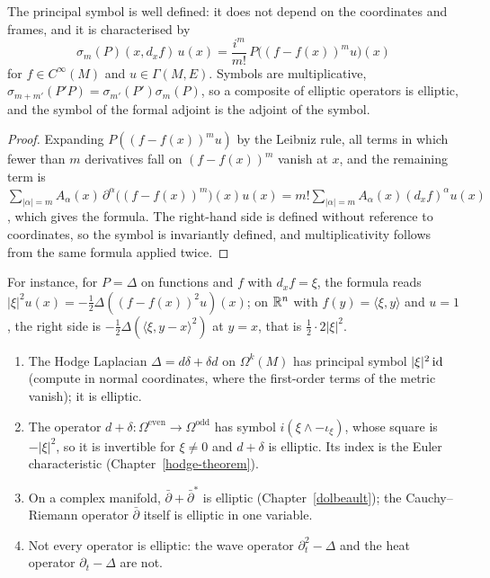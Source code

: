 \begin{proposition}\label{elliptic-operators:proposition-symbol}
The principal symbol is well defined: it does not depend on the coordinates and frames, and it is characterised by
\[
\sigma_m(P)(x, d_xf)\,u(x) = \frac{i^m}{m!}\,P\big((f - f(x))^mu\big)(x)
\]
for $f \in C^\infty(M)$ and $u \in \Gamma(M, E)$. Symbols are multiplicative, $\sigma_{m+m'}(P'P) = \sigma_{m'}(P')\sigma_m(P)$, so a composite of elliptic operators is elliptic, and the symbol of the formal
adjoint is the adjoint of the symbol.
\end{proposition}

\begin{proof}
Expanding $P((f - f(x))^mu)$ by the Leibniz rule, all terms in which fewer than $m$ derivatives fall on $(f - f(x))^m$ vanish at $x$, and the remaining term is
$\sum_{|\alpha| = m}A_\alpha(x)\,\partial^\alpha\big((f - f(x))^m\big)(x)u(x) = m!\sum_{|\alpha| = m}A_\alpha(x)(d_xf)^\alpha u(x)$, which gives the formula. The right-hand side is defined without reference to
coordinates, so the symbol is invariantly defined, and multiplicativity follows from the same formula applied twice.
\end{proof}

For instance, for $P = \Delta$ on functions and $f$ with $d_xf = \xi$, the formula reads $|\xi|^2u(x) = -\frac12\Delta((f - f(x))^2u)(x)$; on $\mathbb{R}^n$ with $f(y) = \langle\xi, y\rangle$ and $u = 1$, the right
side is $-\frac12\Delta(\langle\xi, y - x\rangle^2)$ at $y = x$, that is $\frac12 \cdot 2|\xi|^2$.

\begin{example}\label{elliptic-operators:example-elliptic}
\begin{enumerate}
\item The Hodge Laplacian $\Delta = d\delta + \delta d$ on $\Omega^k(M)$ has principal symbol $|\xi|^2\,\mathrm{id}$ (compute in normal coordinates, where the first-order terms of the metric vanish); it is elliptic.
\item The operator $d + \delta \colon \Omega^{\mathrm{even}} \to \Omega^{\mathrm{odd}}$ has symbol $i(\xi \wedge - \iota_\xi)$, whose square is $-|\xi|^2$, so it is invertible for $\xi \neq 0$ and $d + \delta$ is
elliptic. Its index is the Euler characteristic (Chapter~\ref{hodge-theorem}).
\item On a complex manifold, $\bar\partial + \bar\partial^*$ is elliptic (Chapter~\ref{dolbeault}); the Cauchy--Riemann operator $\bar\partial$ itself is elliptic in one variable.
\item Not every operator is elliptic: the wave operator $\partial_t^2 - \Delta$ and the heat operator $\partial_t - \Delta$ are not.
\end{enumerate}
\end{example}


